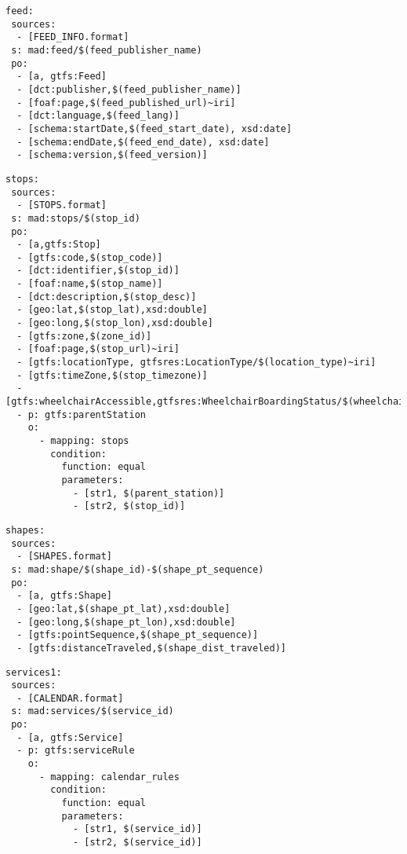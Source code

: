 \begin{lstlisting}[caption=Feed\_Info TripleMap, label=lst:feedInfo, basicstyle=\ttfamily,frame=single]
feed:
 sources:
  - [FEED_INFO.format]
 s: mad:feed/$(feed_publisher_name)
 po:
  - [a, gtfs:Feed]
  - [dct:publisher,$(feed_publisher_name)]
  - [foaf:page,$(feed_published_url)~iri]
  - [dct:language,$(feed_lang)]
  - [schema:startDate,$(feed_start_date), xsd:date]
  - [schema:endDate,$(feed_end_date), xsd:date]
  - [schema:version,$(feed_version)]
\end{lstlisting}
\begin{lstlisting}[caption=Stops TripleMap, label=lst:stops, basicstyle=\ttfamily,frame=single]
stops:
 sources:
  - [STOPS.format]
 s: mad:stops/$(stop_id)
 po:
  - [a,gtfs:Stop]
  - [gtfs:code,$(stop_code)]
  - [dct:identifier,$(stop_id)]
  - [foaf:name,$(stop_name)]
  - [dct:description,$(stop_desc)]
  - [geo:lat,$(stop_lat),xsd:double]
  - [geo:long,$(stop_lon),xsd:double]
  - [gtfs:zone,$(zone_id)]
  - [foaf:page,$(stop_url)~iri]
  - [gtfs:locationType, gtfsres:LocationType/$(location_type)~iri]
  - [gtfs:timeZone,$(stop_timezone)]
  - [gtfs:wheelchairAccessible,gtfsres:WheelchairBoardingStatus/$(wheelchair_boarding)~iri]
  - p: gtfs:parentStation
    o:
      - mapping: stops
        condition:
          function: equal
          parameters:
            - [str1, $(parent_station)]
            - [str2, $(stop_id)]
\end{lstlisting}

\begin{lstlisting}[caption=Shapes TripleMap, label=lst:shapes, basicstyle=\ttfamily,frame=single]
shapes:
 sources:
  - [SHAPES.format]
 s: mad:shape/$(shape_id)-$(shape_pt_sequence)
 po:
  - [a, gtfs:Shape]
  - [geo:lat,$(shape_pt_lat),xsd:double]
  - [geo:long,$(shape_pt_lon),xsd:double]
  - [gtfs:pointSequence,$(shape_pt_sequence)]
  - [gtfs:distanceTraveled,$(shape_dist_traveled)]
\end{lstlisting}

\begin{lstlisting}[caption=Service\_Calendar TripleMap, label=lst:service1, basicstyle=\ttfamily,frame=single]
services1:
 sources:
  - [CALENDAR.format]
 s: mad:services/$(service_id)
 po:
  - [a, gtfs:Service]
  - p: gtfs:serviceRule
    o:
      - mapping: calendar_rules
        condition:
          function: equal
          parameters:
            - [str1, $(service_id)]
            - [str2, $(service_id)]
\end{lstlisting}




